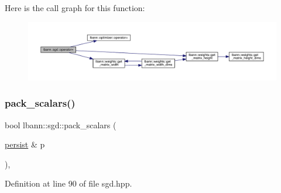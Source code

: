 Here is the call graph for this function\+:\nopagebreak
\begin{figure}[H]
\begin{center}
\leavevmode
\includegraphics[width=350pt]{classlbann_1_1sgd_ad3949e74505cd25b267dbdd5b510a83f_cgraph}
\end{center}
\end{figure}
\mbox{\label{classlbann_1_1sgd_ab95756a63ec3fa0100d436a5a9addfeb}} 
\subsubsection{\texorpdfstring{pack\+\_\+scalars()}{pack\_scalars()}}
{\footnotesize\ttfamily bool lbann\+::sgd\+::pack\+\_\+scalars (\begin{DoxyParamCaption}\item[{\hyperlink{classlbann_1_1persist}{persist} \&}]{p }\end{DoxyParamCaption})\hspace{0.3cm}{\ttfamily [inline]}, {\ttfamily [private]}}



Definition at line 90 of file sgd.\+hpp.


